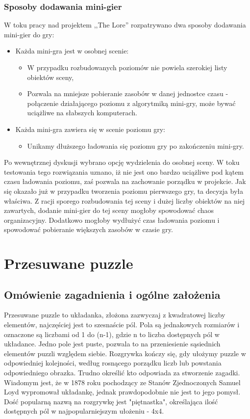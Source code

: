 \documentclass[oneside,polski,logo]{amuthesis}
\begin{document}
\subsubsection{Sposoby dodawania mini-gier}
\par W toku pracy nad projektem ,,The Lore'' rozpatrywano dwa sposoby dodawania mini-gier do gry:
\begin{itemize}
	\item{Każda mini-gra jest w osobnej scenie:}
	\begin{itemize}
		\item W przypadku rozbudowanych poziomów nie powiela szerokiej listy obiektów sceny,
		\item Pozwala na mniejsze pobieranie zasobów w danej jednostce czasu - połączenie działającego poziomu z algorytmiką mini-gry, może bywać uciążliwe na słabszych komputerach.
	\end{itemize}
	\item{Każda mini-gra zawiera się w scenie poziomu gry:}
		\begin{itemize}
		\item Unikamy dłuższego ładowania się poziomu gry po zakończeniu mini-gry.
	\end{itemize}
\end{itemize}

Po wewnętrznej dyskusji wybrano opcję wydzielenia do osobnej sceny. W toku testowania tego rozwiązania uznano, iż nie jest ono bardzo uciążliwe pod kątem czasu ładowania poziomu, zaś pozwala na zachowanie porządku w projekcie. Jak się okazało już w przypadku tworzenia poziomu pierwszego gry, ta decyzja była właściwa. Z racji sporego rozbudowania tej sceny i dużej liczby obiektów na niej zawartych, dodanie mini-gier do tej sceny mogłoby spowodować chaos organizacyjny. Dodatkowo mogłoby wydłużyć czas ładowania poziomu i spowodować pobieranie większych zasobów w czasie gry.

\section{Przesuwane puzzle}
\subsection{Omówienie zagadnienia i ogólne założenia}
\par Przesuwane puzzle to układanka, złożona zazwyczaj z kwadratowej liczby elementów, najczęściej jest to szesnaście pól. Pola są jednakowych rozmiarów i oznaczone są liczbami od 1 do (n-1), gdzie n to liczba dostępnych pól w układance. Jedno pole jest puste, pozwala to na przeniesienie sąsiednich elementów puzzli względem siebie. Rozgrywka kończy się, gdy ułożymy puzzle w odpowiedniej kolejności, według rosnącego porządku liczb lub powstania odpowiedniego obrazka. Trudno określić kto odpowiada za stworzenie zagadki. Wiadomym jest, że w 1878 roku pochodzący ze Stanów Zjednoczonych Samuel Loyd wypromował układankę, jednak prawdopodobnie nie jest to jego pomysł. Dość popularną nazwą na rozgrywkę jest "piętnastka", określająca ilość dostępnych pól w najpopularniejszym ułożeniu - 4x4.  \cite{przesuwane_puzzle}
\end{document}
